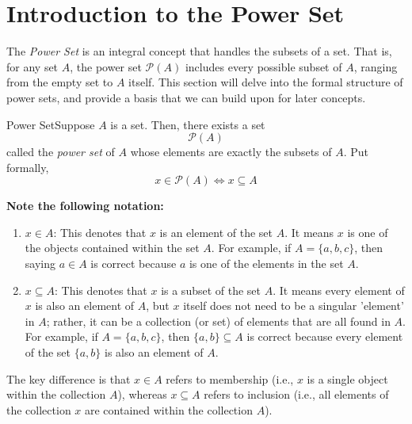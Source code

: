 \renewcommand{\theenumi}{\arabic{enumi}}
\renewcommand{\labelenumi}{\theenumi.}
\section{Introduction to the Power Set}

The \textit{Power Set} is an integral concept that handles the subsets of a set. That is, for any set \(A\), the power set \(\mathcal{P}(A)\) includes every possible subset of \(A\), ranging from the empty set to \(A\) itself. This section will delve into the formal structure of power sets, and provide a basis that we can build upon for later concepts.

\vspace{0.5cm}

\begin{axiom}
    {Power Set}Suppose $A$ is a set. Then, there exists a set $$\mathcal{P}(A)$$
    called the \textit{power set} of $A$ whose elements are exactly the subsets of $A$. Put formally, $$x\in \mathcal{P}(A) \iff x\subseteq A$$
\end{axiom}

\vspace{0.5cm}

\begin{note}
    \textbf{Note the following notation:}

\begin{enumerate}
        
    \item $x\in A$: This denotes that $x$ is an element of the set $A$. It means $x$ is one of the objects contained within the set $A$. For example, if $A=\{a,b,c\}$, then saying $a\in A$ is correct because $a$ is one of the elements in the set $A$.

    \item $x\subseteq A$: This denotes that $x$ is a subset of the set $A$. It means every element of $x$ is also an element of $A$, but $x$ itself does not need to be a singular 'element' in $A$; rather, it can be a collection (or set) of elements that are all found in $A$. For example, if $A=\{a,b,c\}$, then $\{a,b\} \subseteq A$ is correct because every element of the set $\{a,b\}$ is also an element of $A$.
\end{enumerate}

The key difference is that $x\in A$ refers to membership (i.e., $x$ is a single object within the collection $A$), whereas $x\subseteq A$ refers to inclusion (i.e., all elements of the collection $x$ are contained within the collection $A$).
\end{note}

